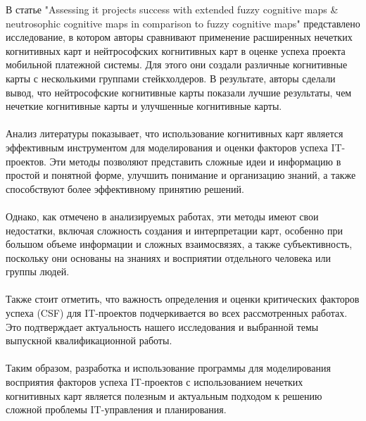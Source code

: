 \documentclass{article}
\begin{document}
    В статье "{}Assessing it projects success with extended fuzzy cognitive maps \& neutrosophic cognitive maps in comparison to fuzzy cognitive maps"{} \cite{litlink20} представлено исследование, в котором авторы сравнивают применение расширенных нечетких когнитивных карт и нейтрософских когнитивных карт в оценке успеха проекта мобильной платежной системы. Для этого они создали различные когнитивные карты с несколькими группами стейкхолдеров. В результате, авторы сделали вывод, что нейтрософские когнитивные карты показали лучшие результаты, чем нечеткие когнитивные карты и улучшенные когнитивные карты.\\
    ~\\
    Анализ литературы показывает, что использование когнитивных карт является эффективным инструментом для моделирования и оценки факторов успеха IT-проектов. Эти методы позволяют представить сложные идеи и информацию в простой и понятной форме, улучшить понимание и организацию знаний, а также способствуют более эффективному принятию решений.\\
    ~\\
    Однако, как отмечено в анализируемых работах, эти методы имеют свои недостатки, включая сложность создания и интерпретации карт, особенно при большом объеме информации и сложных взаимосвязях, а также субъективность, поскольку они основаны на знаниях и восприятии отдельного человека или группы людей.\\
    ~\\
    Также стоит отметить, что важность определения и оценки критических факторов успеха (CSF) для IT-проектов подчеркивается во всех рассмотренных работах. Это подтверждает актуальность нашего исследования и выбранной темы выпускной квалификационной работы.\\
    ~\\
    Таким образом, разработка и использование программы для моделирования восприятия факторов успеха IT-проектов с использованием нечетких когнитивных карт является полезным и актуальным подходом к решению сложной проблемы IT-управления и планирования.\\    \newpage
\end{document}
